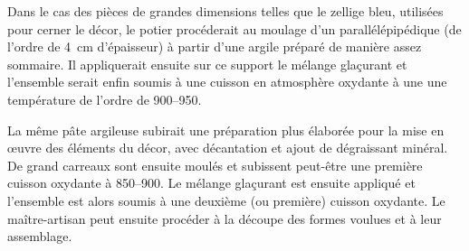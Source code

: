 Dans le cas des pièces de grandes dimensions telles que le zellige 
bleu, utilisées pour cerner le décor, le potier procéderait au moulage 
d'un  parallélépipédique (de l'ordre de \SI{4}{\cm} 
d'épaisseur) à partir d'une argile préparé de manière assez sommaire. 
Il appliquerait ensuite sur ce support le mélange glaçurant et 
l'ensemble serait enfin soumis à une cuisson en atmosphère oxydante 
à une une température de l'ordre de
\SIrange[range-phrase=\ à\ ]{900}{950}{\degC}.

La même pâte argileuse subirait une préparation plus élaborée pour la 
mise en {\oe}uvre des éléments du décor, avec décantation et ajout de 
dégraissant minéral. De grand carreaux sont ensuite moulés et 
subissent peut-être une première cuisson oxydante à 
\SIrange[range-phrase=\ à\ ]{850}{900}{\degC}. Le mélange glaçurant 
est ensuite appliqué et l'ensemble est alors soumis à une deuxième (ou 
première) cuisson oxydante. Le maître-artisan peut ensuite procéder à 
la découpe des formes voulues et à leur assemblage.


